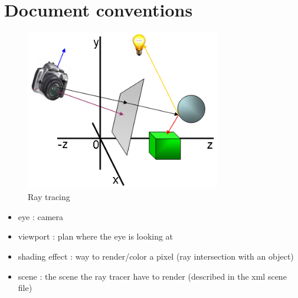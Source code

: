 \section{Document conventions}

\begin{figure}[ht]
  \centering
  \includegraphics[height=7cm]{img/intro.png}
  \caption{Ray tracing}
\end{figure}

\begin{itemize}
  \item eye : camera
  \item viewport : plan where the eye is looking at
  \item shading effect : way to render/color a pixel (ray intersection with an object)
  \item scene : the scene the ray tracer have to render (described in the xml scene file)
\end{itemize}

